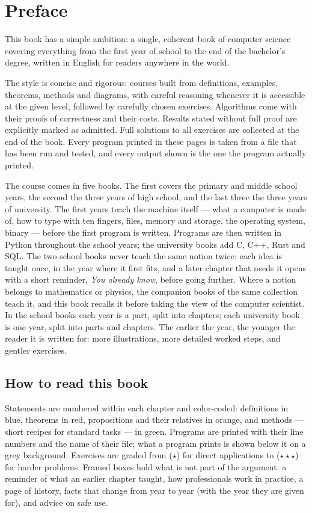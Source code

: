 \chapter{Preface}

This book has a simple ambition: a single, coherent book of computer
science covering everything from the first year of school to the end of
the bachelor's degree, written in English for readers anywhere in the
world.

The style is concise and rigorous: courses built from definitions, examples,
theorems, methods and diagrams, with careful reasoning whenever it is
accessible at the given level, followed by carefully chosen exercises.
Algorithms come with their proofs of correctness and their costs. Results
stated without full proof are explicitly marked as admitted. Full solutions
to all exercises are collected at the end of the book. Every program printed
in these pages is taken from a file that has been run and tested, and every
output shown is the one the program actually printed.

The course comes in five books. The first covers the primary and middle
school years, the second the three years of high school, and the last
three the three years of university. The first years teach the machine
itself --- what a computer is made of, how to type with ten fingers, files,
memory and storage, the operating system, binary --- before the first
program is written. Programs are then written in Python throughout the
school years; the university books add C, C++, Rust and SQL. The two school
books never teach the same notion twice: each idea is taught once, in the
year where it first fits, and a later chapter that needs it opens with a
short reminder, \emph{You already know}, before going further. Where a
notion belongs to mathematics or physics, the companion books of the same
collection teach it, and this book recalls it before taking the view of the
computer scientist. In the school books each year is a part, split into
chapters; each university book is one year, split into parts and chapters.
The earlier the year, the younger the reader it is written for: more
illustrations, more detailed worked steps, and gentler exercises.

\section*{How to read this book}

Statements are numbered within each chapter and color-coded: definitions in
blue, theorems in red, propositions and their relatives in orange, and
methods --- short recipes for standard tasks --- in green. Programs are
printed with their line numbers and the name of their file; what a program
prints is shown below it on a grey background. Exercises are graded from
($\star$) for direct applications to ($\star\star\star$) for harder
problems. Framed boxes hold what is not part of the argument: a reminder of
what an earlier chapter taught, how professionals work in practice, a page
of history, facts that change from year to year (with the year they are
given for), and advice on safe use.


